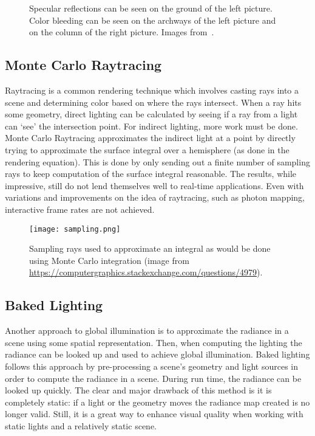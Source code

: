 \begin{figure}[h]
\centering
{}
\caption{Specular reflections can be seen on the ground of the left picture. Color bleeding can be seen on the archways of the left picture and on the column of the right picture. Images from~\cite{crassin2011interactive}.}
\label{fig:giqualities}
\end{figure}

\subsection{Monte Carlo Raytracing}
Raytracing is a common rendering technique which involves casting rays into a scene and determining color based on where the rays intersect. When a ray hits some geometry, direct lighting can be calculated by seeing if a ray from a light can `see' the intersection point. For indirect lighting, more work must be done. Monte Carlo Raytracing approximates the indirect light at a point by directly trying to approximate the surface integral over a hemisphere (as done in the rendering equation). This is done by only sending out a finite number of sampling rays to keep computation of the surface integral reasonable. The results, while impressive, still do not lend themselves well to real-time applications. Even with variations and improvements on the idea of raytracing, such as photon mapping, interactive frame rates are not achieved. 

\begin{figure}[h]
\centering
\texttt{[image: sampling.png]}
\caption{Sampling rays used to approximate an integral as would be done using Monte Carlo integration (image from \url{https://computergraphics.stackexchange.com/questions/4979}).}
\label{fig:sampling}
\end{figure}

\subsection{Baked Lighting}
Another approach to global illumination is to approximate the radiance in a scene using some spatial representation. Then, when computing the lighting the radiance can be looked up and used to achieve global illumination. Baked lighting follows this approach by pre-processing a scene's geometry and light sources in order to compute the radiance in a scene. During run time, the radiance can be looked up quickly. The clear and major drawback of this method is it is completely static: if a light or the geometry moves the radiance map created is no longer valid. Still, it is a great way to enhance visual quality when working with static lights and a relatively static scene.

